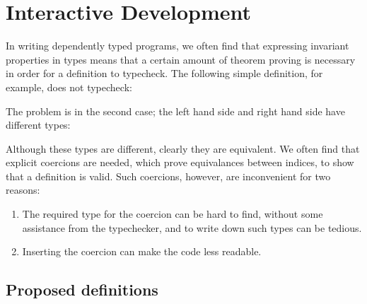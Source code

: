 \newcommand{\bO}{\DC{O}}
\newcommand{\bI}{\DC{I}}
\newcommand{\bitPair}{\DC{bitpair}}
\newcommand{\BitPair}{\TC{BitPair}}
\newcommand{\none}{\DC{none}}
\newcommand{\bit}{\DC{bit}}
\newcommand{\Bit}{\TC{Bit}}
\newcommand{\Number}{\TC{Number}}
\newcommand{\NumCarry}{\TC{NumCarry}}
\newcommand{\numCarry}{\DC{numCarry}}

\section{Interactive Development}

\label{interactive}

In writing dependently typed programs, we often find that expressing
invariant properties in types means that a certain amount of theorem
proving is necessary in order for a definition to typecheck. The
following simple definition, for example, does not typecheck:


\noindent
The problem is in the second case; the left hand side and right hand
side have different types:


Although these types are different, clearly they are equivalent. We
often find that explicit coercions are needed, which prove
equivalances between indices, to show that a definition is valid. Such
coercions, however, are inconvenient for two reasons:

\begin{enumerate}
\item The required type for the coercion can be hard to find, without
  some assistance from the typechecker, and to write down such types
  can be tedious.
\item Inserting the coercion can make the code less readable.
\end{enumerate}

\subsection{Proposed definitions}


